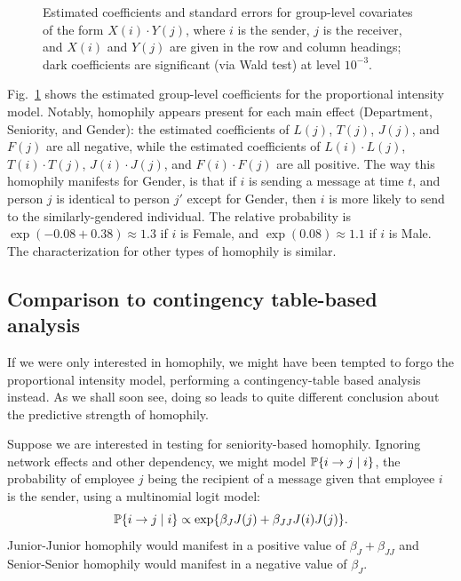 \documentclass[final]{statsoc}
\begin{document}
\begin{figure}[h]
  \centering
  \makebox[\textwidth]{
    \scriptsize
    
  }
  \caption{
    Estimated coefficients and standard errors for group-level covariates
    of the form $X(i) \cdot Y(j)$, where $i$ is the sender, $j$ is the
    receiver, and $X(i)$ and $Y(j)$ are given in the row and column
    headings; dark coefficients are significant (via Wald test) at
    level $10^{-3}$.
  }
  \label{T:group-dynamic}
\end{figure}

Fig.~\ref{T:group-dynamic} shows the estimated group-level coefficients for
the proportional intensity model.  Notably, homophily appears present for each
main effect (Department, Seniority, and Gender): the estimated coefficients of
$L(j)$, $T(j)$, $J(j)$, and $F(j)$ are all negative, while the estimated
coefficients of $L(i) \cdot L(j)$, $T(i) \cdot T(j)$, $J(i) \cdot J(j)$, and
$F(i) \cdot F(j)$ are all positive.  The way this homophily manifests for
Gender, is that if $i$ is sending a message at time $t$, and person $j$ is
identical to person $j'$ except for Gender, then $i$ is more likely to send to
the similarly-gendered individual.  The relative probability is $\exp(-0.08 +
0.38) \approx 1.3$ if $i$ is Female, and $\exp(0.08) \approx 1.1$ if $i$ is
Male.  The characterization for other types of homophily is similar.


\subsection{Comparison to contingency table-based analysis}

If we were only interested in homophily, we might have been tempted to forgo
the proportional intensity model, performing a contingency-table based analysis
instead.  As we shall soon see, doing so leads to quite different conclusion
about the predictive strength of homophily.

Suppose we are interested in testing for seniority-based homophily.  Ignoring
network effects and other dependency, we might model $\mathbb{P}\{ i \to j \mid i
\}$, the probability of employee $j$ being the recipient of a message given
that employee $i$ is the sender, using a multinomial logit model:
\[
  \mathbb{P}\{ i \to j \mid i \}
    \propto \exp\{ \beta_J J(j) + \beta_{JJ} J(i) J(j) \}.
\]
Junior-Junior homophily would manifest in a positive value of
$\beta_{J} + \beta_{JJ}$ and Senior-Senior homophily would manifest in
a negative value of $\beta_J$. 
\end{document}

